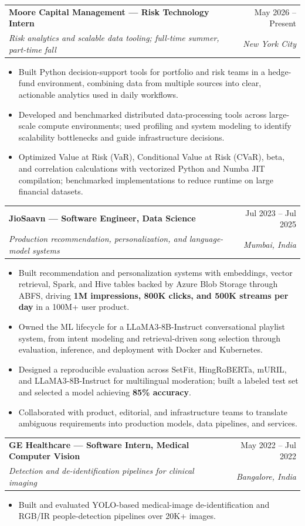 \documentclass[10pt,letterpaper]{article}
\makeatletter
\newcommand{\entry}[4]{%
  \begin{tabularx}{\textwidth}{@{}Xr@{}}
    \textbf{#1} & #2 \\
    \textit{#3} & \textit{#4}
  \end{tabularx}\vspace{-0.2em}
}
\makeatother
\begin{document}
\entry{Moore Capital Management --- Risk Technology Intern}{May 2026 -- Present}{Risk analytics and scalable data tooling; full-time summer, part-time fall}{New York City}
\begin{itemize}
  \item Built Python decision-support tools for portfolio and risk teams in a hedge-fund environment, combining data from multiple sources into clear, actionable analytics used in daily workflows.
  \item Developed and benchmarked distributed data-processing tools across large-scale compute environments; used profiling and system modeling to identify scalability bottlenecks and guide infrastructure decisions.
  \item Optimized Value at Risk (VaR), Conditional Value at Risk (CVaR), beta, and correlation calculations with vectorized Python and Numba JIT compilation; benchmarked implementations to reduce runtime on large financial datasets.
\end{itemize}

\vspace{0.5em}
\entry{JioSaavn --- Software Engineer, Data Science}{Jul 2023 -- Jul 2025}{Production recommendation, personalization, and language-model systems}{Mumbai, India}
\begin{itemize}
  \item Built recommendation and personalization systems with embeddings, vector retrieval, Spark, and Hive tables backed by Azure Blob Storage through ABFS, driving \textbf{1M impressions, 800K clicks, and 500K streams per day} in a 100M+ user product.
  \item Owned the ML lifecycle for a LLaMA3-8B-Instruct conversational playlist system, from intent modeling and retrieval-driven song selection through evaluation, inference, and deployment with Docker and Kubernetes.
  \item Designed a reproducible evaluation across SetFit, HingRoBERTa, mURIL, and LLaMA3-8B-Instruct for multilingual moderation; built a labeled test set and selected a model achieving \textbf{85\% accuracy}.
  \item Collaborated with product, editorial, and infrastructure teams to translate ambiguous requirements into production models, data pipelines, and services.
\end{itemize}

\vspace{0.5em}
\entry{GE Healthcare --- Software Intern, Medical Computer Vision}{May 2022 -- Jul 2022}{Detection and de-identification pipelines for clinical imaging}{Bangalore, India}
\begin{itemize}
  \item Built and evaluated YOLO-based medical-image de-identification and RGB/IR people-detection pipelines over 20K+ images.
\end{itemize}
\end{document}
